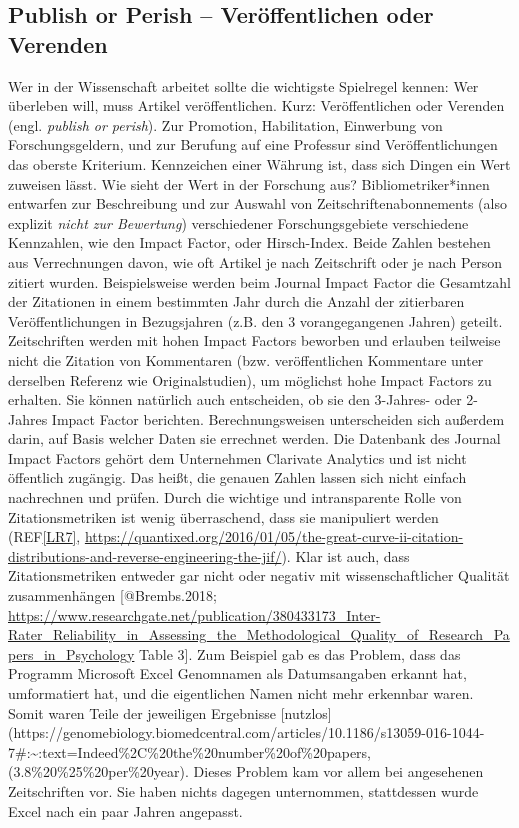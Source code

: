 \documentclass[
  letterpaper,
  DIV=11,
  numbers=noendperiod]{scrreprt}
\begin{document}
\subsection{Publish or Perish -- Veröffentlichen oder
Verenden}\label{publish-or-perish-veruxf6ffentlichen-oder-verenden}

Wer in der Wissenschaft arbeitet sollte die wichtigste Spielregel
kennen: Wer überleben will, muss Artikel veröffentlichen. Kurz:
Veröffentlichen oder Verenden (engl. \emph{publish or perish}). Zur
Promotion, Habilitation, Einwerbung von Forschungsgeldern, und zur
Berufung auf eine Professur sind Veröffentlichungen das oberste
Kriterium. Kennzeichen einer Währung ist, dass sich Dingen ein Wert
zuweisen lässt. Wie sieht der Wert in der Forschung aus?
Bibliometriker*innen entwarfen zur Beschreibung und zur Auswahl von
Zeitschriftenabonnements (also explizit \emph{nicht zur Bewertung})
verschiedener Forschungsgebiete verschiedene Kennzahlen, wie den Impact
Factor, oder Hirsch-Index. Beide Zahlen bestehen aus Verrechnungen
davon, wie oft Artikel je nach Zeitschrift oder je nach Person zitiert
wurden. Beispielsweise werden beim Journal Impact Factor die Gesamtzahl
der Zitationen in einem bestimmten Jahr durch die Anzahl der zitierbaren
Veröffentlichungen in Bezugsjahren (z.B. den 3 vorangegangenen Jahren)
geteilt. Zeitschriften werden mit hohen Impact Factors beworben und
erlauben teilweise nicht die Zitation von Kommentaren (bzw.
veröffentlichen Kommentare unter derselben Referenz wie
Originalstudien), um möglichst hohe Impact Factors zu erhalten. Sie
können natürlich auch entscheiden, ob sie den 3-Jahres- oder 2-Jahres
Impact Factor berichten. Berechnungsweisen unterscheiden sich außerdem
darin, auf Basis welcher Daten sie errechnet werden. Die Datenbank des
Journal Impact Factors gehört dem Unternehmen Clarivate Analytics und
ist nicht öffentlich zugängig. Das heißt, die genauen Zahlen lassen sich
nicht einfach nachrechnen und prüfen. Durch die wichtige und
intransparente Rolle von Zitationsmetriken ist wenig überraschend, dass
sie manipuliert werden (REF\hyperref[_msocom_7]{{[}LR7{]}},
\url{https://quantixed.org/2016/01/05/the-great-curve-ii-citation-distributions-and-reverse-engineering-the-jif/}).
Klar ist auch, dass Zitationsmetriken entweder gar nicht oder negativ
mit wissenschaftlicher Qualität zusammenhängen {[}@Brembs.2018;
\url{https://www.researchgate.net/publication/380433173_Inter-Rater_Reliability_in_Assessing_the_Methodological_Quality_of_Research_Papers_in_Psychology}
Table 3{]}. Zum Beispiel gab es das Problem, dass das Programm Microsoft
Excel Genomnamen als Datumsangaben erkannt hat, umformatiert hat, und
die eigentlichen Namen nicht mehr erkennbar waren. Somit waren Teile der
jeweiligen Ergebnisse
{[}nutzlos{]}(https://genomebiology.biomedcentral.com/articles/10.1186/s13059-016-1044-7\#:\textasciitilde:text=Indeed\%2C\%20the\%20number\%20of\%20papers,(3.8\%20\%25\%20per\%20year).
Dieses Problem kam vor allem bei angesehenen Zeitschriften vor. Sie
haben nichts dagegen unternommen, stattdessen wurde Excel nach ein paar
Jahren angepasst.
\end{document}
